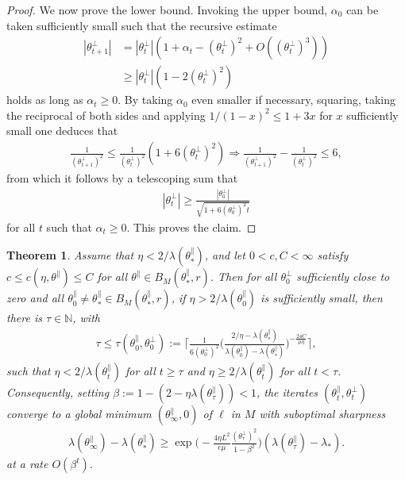 \documentclass{article}
\newcommand{\NB}{\mathbb{N}}
\newcommand{\tpa}{\theta^{\parallel}}
\newcommand{\tpe}{\theta^{\perp}}
\theoremstyle{plain}
\newtheorem{theorem}{Theorem}[section]
\theoremstyle{definition}
\theoremstyle{remark}
\begin{document}
\begin{proof}
    We now prove the lower bound. Invoking the upper bound, $\alpha_0$ can be taken sufficiently small such that the recursive estimate
    \begin{align}
        |\tpe_{t+1}| &= |\tpe_t|(1+\alpha_t-(\tpe_t)^2 + O((\tpe_t)^3))\\&\geq |\tpe_t|(1-2(\tpe_t)^2)
    \end{align}
    holds as long as $\alpha_t\geq 0$. By taking $\alpha_0$ even smaller if necessary, squaring, taking the reciprocal of both sides and applying $1/(1-x)^2\leq 1+3x$ for $x$ sufficiently small one deduces that
    \begin{align}
        \frac{1}{(\tpe_{t+1})^2}\leq \frac{1}{(\tpe_t)^2}(1+6(\tpe_t)^2)\Rightarrow \frac{1}{(\tpe_{t+1})^2}-\frac{1}{(\tpe_t)^2}\leq 6,
    \end{align}
    from which it follows by a telescoping sum that
    \begin{align}
        |\tpe_t|\geq \frac{|\tpe_0|}{\sqrt{1+6(\tpe_0)^2t}}
    \end{align}
    for all $t$ such that $\alpha_t\geq 0$. This proves the claim.
\end{proof}

\begin{theorem}\label{thm:subcrit}
    Assume that $\eta< 2/\lambda(\tpa_*)$, and let $0<c,C<\infty$ satisfy $c\leq c(\eta,\tpa)\leq C$ for all $\tpa\in B_M(\tpa_*,r)$. Then for all $\tpe_0$ sufficiently close to zero and all $\tpa_0\neq\tpa_*\in B_M(\tpa_*,r)$, if $\eta>2/\lambda(\tpa_0)$ is sufficiently small, then there is $\tau\in\NB$, with
    \begin{align}
        \tau\leq\tau(\tpa_0,\tpe_0):= \bigg\lceil \frac{1}{6(\tpe_0)^2}\bigg(\frac{2/\eta-\lambda(\tpa_*)}{\lambda(\tpa_0)-\lambda(\tpa_*)}\bigg)^{-\frac{24C}{\mu\eta}}\bigg\rceil,
    \end{align}
    such that $\eta<2/\lambda(\tpa_t)$ for all $t\geq\tau$ and $\eta\geq 2/\lambda(\tpa_t)$ for all $t<\tau$.   Consequently, setting $\beta:=1-(2-\eta\lambda(\tpa_{\tau}))<1$, the iterates $(\tpa_t,\tpe_t)$ converge to a global minimum $(\tpa_{\infty},0)$ of $\ell$ in $M$ with suboptimal sharpness
    \begin{align}
        \lambda(\tpa_{\infty})-\lambda(\tpa_*)\geq \exp\bigg(-\frac{4\eta L^2}{c\mu}\frac{(\tpe_{\tau})^2}{1-\beta^2}\bigg)(\lambda(\tpa_{\tau})-\lambda_*).
    \end{align}
    at a rate $O(\beta^t)$.
\end{theorem}
\end{document}
